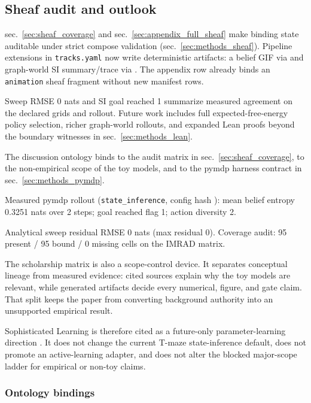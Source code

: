 \documentclass[
  english,
]{article}
\begin{document}
\subsection{Sheaf audit and outlook}\label{sheaf-audit-and-outlook}

sec.~\ref{sec:sheaf_coverage} and sec.~\ref{sec:appendix_full_sheaf}
make binding state auditable under strict compose validation
(sec.~\ref{sec:methods_sheaf}). Pipeline extensions in
\texttt{tracks.yaml}  now write deterministic
artifacts: a belief GIF via  and
graph-world SI summary/trace via .
The appendix row already binds an \texttt{animation} sheaf fragment
without new manifest rows.

Sweep RMSE 0 nats and SI goal reached 1 summarize measured agreement on
the declared grids and rollout. Future work includes full
expected-free-energy policy selection, richer graph-world rollouts, and
expanded Lean proofs beyond the boundary witnesses in
sec.~\ref{sec:methods_lean}.

The discussion ontology binds  to the audit
matrix in sec.~\ref{sec:sheaf_coverage},  to
the non-empirical scope of the toy models, and
 to the pymdp harness contract in
sec.~\ref{sec:methods_pymdp}.

Measured pymdp rollout (\texttt{state\_inference}, config hash
): mean belief entropy 0.3251 nats over 2
steps; goal reached flag 1; action diversity 2.

Analytical sweep residual RMSE 0 nats (max residual 0). Coverage audit:
95 present / 95 bound / 0 missing cells on the IMRAD matrix.

The scholarship matrix is also a scope-control device. It separates
conceptual lineage from measured evidence: cited sources explain why the
toy models are relevant, while generated artifacts decide every
numerical, figure, and gate claim. That split keeps the paper from
converting background authority into an unsupported empirical result.

Sophisticated Learning is therefore cited as a future-only
parameter-learning direction \citep{hodson2023sophisticatedlearning}. It
does not change the current T-maze state-inference default, does not
promote an active-learning adapter, and does not alter the blocked
major-scope ladder for empirical or non-toy claims.

\subsubsection{Ontology bindings}\label{ontology-bindings-3}
\end{document}
